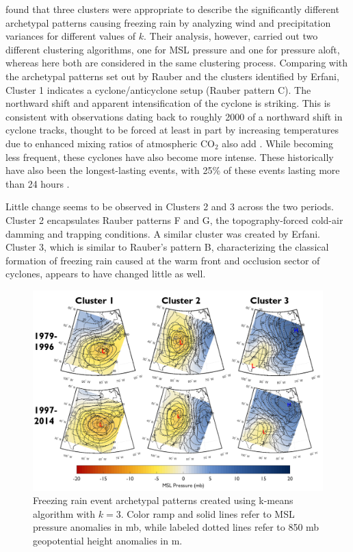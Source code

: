\documentclass[twocol]{ametsoc}
\begin{document}
\citet{erfani2012automated} found that three clusters were appropriate to describe the significantly different archetypal patterns causing freezing rain by analyzing wind and precipitation variances for different values of $k$. Their analysis, however, carried out two different clustering algorithms, one for MSL pressure and one for pressure aloft, whereas here both are considered in the same clustering process. 
Comparing with the archetypal patterns set out by Rauber and the clusters identified by Erfani, Cluster 1 indicates a cyclone/anticyclone setup (Rauber pattern C). The northward shift and apparent intensification of the cyclone is striking. This is consistent with observations dating back to roughly 2000 of a northward shift in cyclone tracks, thought to be forced at least in part by increasing temperatures due to enhanced mixing ratios of atmospheric CO$_2$ \citep{mccabe2001trends} also add \citep{chang2016northern}. While becoming less frequent, these cyclones have also become more intense. These historically have also been the longest-lasting events, with 25\% of these events lasting more than 24 hours \citep{rauber2001synoptic}. 

Little change seems to be observed in Clusters 2 and 3 across the two periods. Cluster 2 encapsulates Rauber patterns F and G, the topography-forced cold-air damming and trapping conditions. A similar cluster was created by Erfani. Cluster 3, which is similar to Rauber's pattern B, characterizing the classical formation of freezing rain caused at the warm front and occlusion sector of cyclones, appears to have changed little as well.

\begin{figure}
\centering
\includegraphics[width=\textwidth]{Clusters.PNG}
\caption{\label{fig:clusters} Freezing rain event archetypal patterns created using k-means algorithm with $k=3$. Color ramp and solid lines refer to MSL pressure anomalies in mb, while labeled dotted lines refer to 850 mb geopotential height anomalies in m.}
\end{figure}
\end{document}
